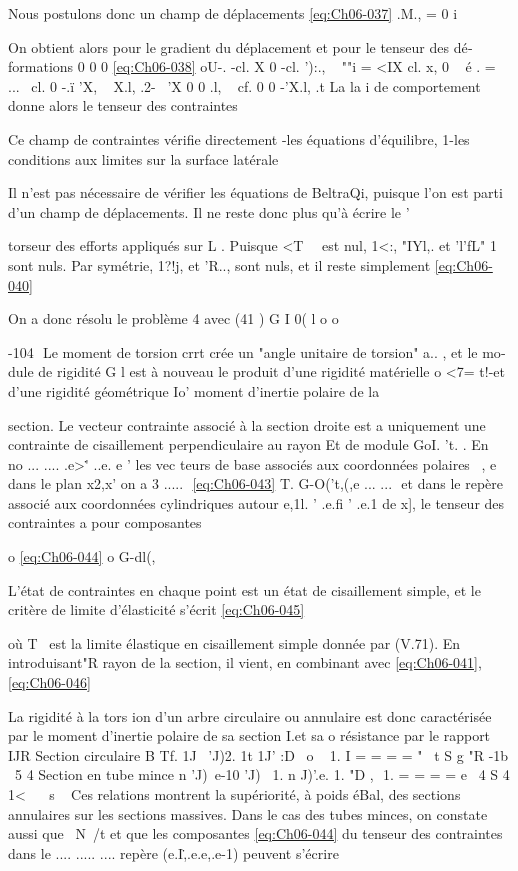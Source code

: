 Nous postulons donc un champ de déplacements 
\eqref{eq:Ch06-037} .M., = 0
i 

On obtient alors pour le gradient du déplacement et pour le tenseur des dé­formations 
0 0 0 
\eqref{eq:Ch06-038} oU-. 
-cl. X 0 -cl. '):., 
~
""i = 
<IX cl. x, 0 
~ 
é . 
= 
...~ 
cl.
0 -.ï 'X, ~ X.l,
.2­-~ 'X 0 0 .l, ~ cf. 
0 0
-'X.l,
.t 
La la i de comportement donne alors le tenseur des contraintes 

Ce champ de contraintes vérifie directement -les équations d'équilibre, 
1-les conditions aux limites sur la surface latérale 

Il  n'est  pas  nécessaire  de  vérifier les  équations  de  BeltraQi,  puisque  l'on  
est  parti d'un champ  de  déplacements.  Il  ne  reste  donc  plus qu'à écrire  le  
' 

torseur des efforts appliqués sur L . Puisque <T~~ est nul, 1<:, "IYl,. et 'l'fL"
1 
sont nuls. Par symétrie, 1?!j, et 'R.., sont nuls, et il reste simplement 
\eqref{eq:Ch06-040} 


On a donc résolu le problème 4 avec 
(41 ) G I 0( l 
o 
o 


-104 ­
Le moment de torsion crrt crée un "angle unitaire de torsion" a.. , et le mo­
dule de rigidité G l est à nouveau le produit d'une rigidité matérielle 
o 
<7= t!-et d'une rigidité géométrique Io' moment d'inertie polaire de la 

section. 
Le vecteur contrainte associé à la section droite est 
a uniquement une contrainte de cisaillement perpendiculaire au 
rayon Et de module GoI. 't. . En no­
... ....
.e>\. ' ..e. e ' les vec teurs de base associés aux coordonnées polai­res ~, e dans le plan x2,x' on a
3 
..... ­
\eqref{eq:Ch06-043} T. G-O('t,(,e 
... ... ­
et dans le repère associé aux coordonnées cylindriques autour
e,1l. ' .e.fi ' .e.1 de x], le tenseur des contraintes a pour composantes 

o 
\eqref{eq:Ch06-044} 
o 
G-dl(, 

L'état de contraintes en chaque point est un état de cisaillement simple, et le critère de limite d'élasticité s'écrit 
\eqref{eq:Ch06-045} 


où T~ est la limite élastique en cisaillement simple donnée par (V.71). En introduisant"R rayon de la section, il vient, en combinant avec \eqref{eq:Ch06-041}, 
\eqref{eq:Ch06-046} 


La rigidité à la tors ion d'un arbre circulaire ou annulaire est donc caractérisée par le moment d'inertie polaire de sa section I.et sa 
o 
résistance par le rapport 
IJR 
Section circulaire 
B 
Tf. 1J~ 'J)2. 1t 1J' :D
~o ~ 1.
I = = =
= 
" ~t S g "R -1b ~5 4­
Section en tube mince 
n 'J)~e-10 'J)~ 1. n J)'.e. 1. "D
, ­
1. = = = = 
e~ 
4 S 4 1< ~ ~s ~ 
Ces relations montrent la supériorité, à poids éBal, des sections annulaires sur les sections massives. Dans le cas des tubes minces, on constate aussi 
que ~N~/t et que les composantes \eqref{eq:Ch06-044} du tenseur des contraintes dans le 
.... ..... ....
repère (e.I\.,.e.e,.e-1) peuvent s'écrire 


